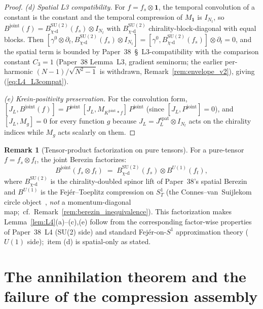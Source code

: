 \documentclass[11pt,a4paper]{article}
\theoremstyle{plain}
\theoremstyle{definition}
\newtheorem{remark}[theorem]{Remark}
\newcommand{\Nt}{N_{t}}
\newcommand{\Sone}{S^{1}}
\newcommand{\SoneT}{S^{1}_{T}}
\newcommand{\SU}{\mathrm{SU}}
\newcommand{\Uone}{U(1)}
\newcommand{\JL}{J_{L}}
\newcommand{\Bjoint}{B^{\mathrm{joint}}}
\newcommand{\Pjoint}{P^{\mathrm{joint}}}
\newcommand{\Kjoint}{K^{\mathrm{joint}}}
\newcommand{\spat}{\mathrm{spat}}
\newcommand{\chid}{\chi\text{-d}}
\begin{document}
\begin{proof}
\emph{(d) Spatial L3 compatibility.} For $f = f_{s} \otimes
\mathbf{1}$, the temporal convolution of a constant is the constant
and the temporal compression of $M_{\mathbf{1}}$ is $I_{\Nt}$, so
$\Bjoint(f) = B^{\SU(2)}_{\chid}(f_{s}) \otimes I_{\Nt}$ with
$B^{\SU(2)}_{\chid}$ chirality-block-diagonal with equal blocks. Then
$[\gamma^{0} \otimes \partial_{t}, B^{\SU(2)}_{\chid}(f_{s}) \otimes
I_{\Nt}] = [\gamma^{0}, B^{\SU(2)}_{\chid}(f_{s})] \otimes \partial_{t}
= 0$, and the spatial term is bounded by Paper~38~\S~L3-compatibility
with the comparison constant $C_{3} = 1$ (Paper~38 Lemma~L3, gradient
seminorm; the earlier per-harmonic $(N-1)/\sqrt{N^{2}-1}$ is withdrawn,
Remark~\ref{rem:envelope_v2}), giving (\ref{eq:L4_L3compat}).

\emph{(e) Krein-positivity preservation.} For the convolution form,
$[\JL, \Bjoint(f)] = \Pjoint\,[\JL, M_{\Kjoint \ast f}]\,\Pjoint$
(since $[\JL, \Pjoint] = 0$), and $[\JL, M_{g}] = 0$ for every
function $g$ because $\JL = \JL^{\spat} \otimes I_{\Nt}$ acts on the
chirality indices while $M_{g}$ acts scalarly on them. \qedhere
\end{proof}

\begin{remark}[Tensor-product factorization on pure tensors]\label{rem:L4_factorize}
For a pure-tensor $f = f_{s} \otimes f_{t}$, the joint Berezin
factorizes:
\begin{equation}\label{eq:L4_factorize}
   \Bjoint(f_{s} \otimes f_{t})
   \;=\; B^{\SU(2)}_{\chid}(f_{s}) \otimes B^{\Uone}(f_{t}),
\end{equation}
where $B^{\SU(2)}_{\chid}$ is the chirality-doubled spinor lift of
Paper~38's spatial Berezin and $B^{\Uone}$ is the Fej\'er--Toeplitz
compression on $\SoneT$ (the Connes--van~Suijlekom circle
object~\cite{connes_vs2021}, \emph{not} a momentum-diagonal map;\ cf.\
Remark~\ref{rem:berezin_inequivalence}). This factorization makes
Lemma~\ref{lem:L4}(a)--(c),(e) follow from the corresponding
factor-wise properties of Paper~38~L4 (SU(2) side) and standard
Fej\'er-on-$\Sone$ approximation theory ($\Uone$ side);\ item (d) is
spatial-only as stated.
\end{remark}

\section{The annihilation theorem and the failure of the compression assembly}\label{sec:main}
\end{document}
